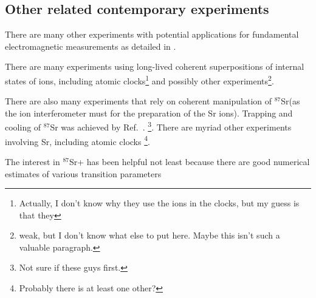 \subsection{Other related contemporary experiments}

There are many other experiments with potential applications for fundamental electromagnetic measurements as detailed in \cite{PhotonMassSurvey}. 

There are many experiments using long-lived coherent superpositions of internal states of ions, including atomic clocks\cite{Rosenband_ion_clock}\footnote{Actually, I don't know why they use the ions in the clocks, but my guess is that they } and possibly other experiments\footnote{weak, but I don't know what else to put here. Maybe this isn't such a valuable paragraph.}.

There are also many experiments that rely on coherent manipulation of $^{87}$Sr(as the ion interferometer must for the preparation of the Sr ions). Trapping and cooling of $^{87}$Sr was achieved by Ref.~\cite{kurosu_trap_sr}. \footnote{Not sure if these guys first.}.  
There are myriad other experiments involving Sr, including atomic clocks \cite{ludlow_science}\footnote{Probably there is at least one other?}.

The interest in $^{87}$Sr+ has been helpful not least because there are good numerical estimates of various transition parameters \cite{safronovaTheory}



